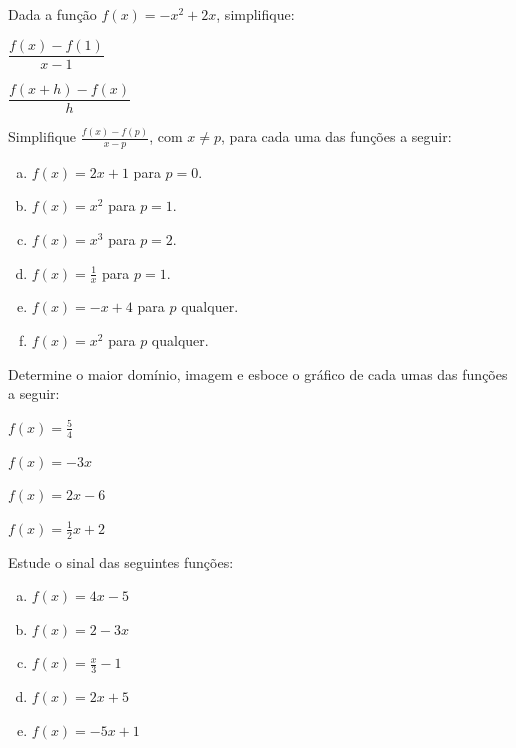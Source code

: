 \begin{secExercicios}
    \begin{exer}
        Dada a função $f(x)=-x^2+2x$, simplifique:
        \begin{enumerate}[a)]
        \begin{multicols}{2}
            \item $\dfrac{f(x)-f(1)}{x-1}$
            \item $\dfrac{f(x+h)-f(x)}{h}$
        \end{multicols}
        \end{enumerate}
    \end{exer}

    \begin{exer}
        Simplifique $\frac{f(x)-f(p)}{x-p}$, com $x\neq p$, para cada uma das funções a seguir:
        \begin{enumerate}[a)]
            \item $f(x)=2x+1$ para $p=0$.
            \item $f(x)=x^2$ para $p=1$.
            \item $f(x)=x^3$ para $p=2$.
            \item $f(x)=\frac{1}{x}$ para $p=1$.
            \item $f(x)=-x+4$ para $p$ qualquer.
            \item $f(x)=x^2$ para $p$ qualquer.
        \end{enumerate}
    \end{exer}

    \begin{exer}
        Determine o maior domínio, imagem e esboce o gráfico de cada umas das funções a seguir:
        \begin{enumerate}[a)]
        \begin{multicols}{2}
            \item $f(x)=\frac{5}{4}$
            \item $f(x)=-3x$
            \item $f(x)=2x-6$
            \item $f(x)=\frac{1}{2}x +2$
        \end{multicols}
        \end{enumerate}
    \end{exer}

    \begin{exer}
        Estude o sinal das seguintes funções:
        \begin{enumerate}[a)]
            \item $f(x)=4x-5$
            \item $f(x)=2-3x$
            \item $f(x)=\frac{x}{3}-1$
            \item $f(x)=2x+5$
            \item $f(x)=-5x+1$
        \end{enumerate}
    \end{exer}


\end{secExercicios}
